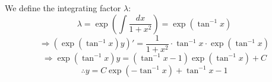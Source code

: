 \item

We define the integrating factor $\lambda$:
\[
	\lambda = \exp \left( \int \frac{dx}{1 + x^2} \right) = \exp \left( \tan^{-1} x \right)
\]
\[
	\Rightarrow \left( \exp \left( \tan^{-1} x \right) y \right)'
	= \frac{1}{1 + x^2} \cdot \tan^{-1} x \cdot \exp \left( \tan^{-1} x \right)
\]
\[
	\Rightarrow \exp \left( \tan^{-1} x \right) y
	= \left( \tan^{-1}x - 1 \right) \exp \left( \tan^{-1} x \right) + C
\]
\[
	\therefore y = C \exp \left( -\tan^{-1} x \right) + \tan^{-1} x - 1
\]